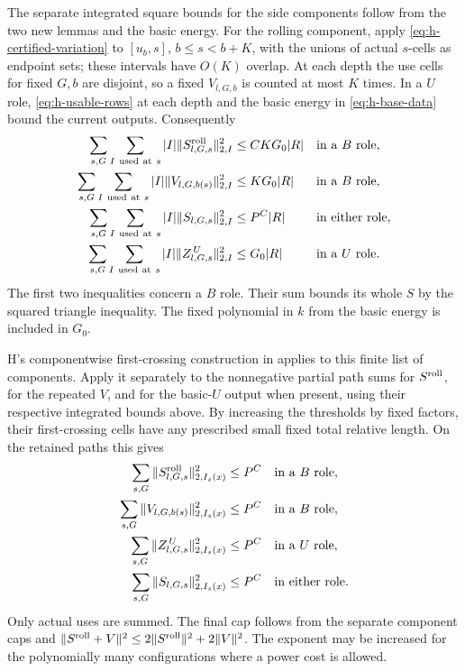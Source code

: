 The separate integrated square bounds for the side components
follow from the two new lemmas and the basic energy.  For the
rolling component, apply \eqref{eq:h-certified-variation} to
\([u_b,s]\), \(b\le s<b+K\), with the unions of actual \(s\)-cells
as endpoint sets; these intervals have \(O(K)\) overlap.  At each
depth the use cells for fixed \(G,b\) are disjoint, so a fixed
\(V_{l,G,b}\) is counted at most \(K\) times.  In a \(U\) role,
\eqref{eq:h-usable-rows} at each depth and the basic energy in
\eqref{eq:h-base-data} bound the current outputs.  Consequently
\begin{equation}
 \begin{aligned}
 \sum_{s,G}\sum_{I\ {\rm used\ at}\ s}|I|
       \|S^{\rm roll}_{l,G,s}\|_{2,I}^2
       &\le CK G_0|R| &&\text{in a \(B\) role},\\
 \sum_{s,G}\sum_{I\ {\rm used\ at}\ s}|I|
       \|V_{l,G,b(s)}\|_{2,I}^2
       &\le K G_0|R| &&\text{in a \(B\) role},\\
 \sum_{s,G}\sum_{I\ {\rm used\ at}\ s}|I|
       \|S_{l,G,s}\|_{2,I}^2
       &\le P^C|R| &&\text{in either role},\\
 \sum_{s,G}\sum_{I\ {\rm used\ at}\ s}|I|
       \|Z^{\,U}_{l,G,s}\|_{2,I}^2
       &\le G_0|R| &&\text{in a \(U\) role}.
 \end{aligned}
 \label{eq:h-side-square}
\end{equation}
The first two inequalities concern a \(B\) role.  Their sum
bounds its whole \(S\) by the squared triangle inequality.
The fixed polynomial in \(k\) from the basic energy is included
in \(G_0\).

H's componentwise first-crossing construction in
\cite[Section~7, Side estimate]{H} applies to this finite list of
components.  Apply it separately to the nonnegative partial path
sums for \(S^{\rm roll}\), for the repeated \(V\), and for the
basic-\(U\) output when present, using their respective integrated
bounds above.  By increasing the thresholds by fixed factors,
their first-crossing cells have any prescribed small fixed total
relative length.  On the retained paths this gives
\begin{equation}
 \begin{aligned}
 \sum_{s,G}\|S^{\rm roll}_{l,G,s}\|_{2,I_s(x)}^2
       &\le P^C &&\text{in a \(B\) role},\\
 \sum_{s,G}\|V_{l,G,b(s)}\|_{2,I_s(x)}^2
       &\le P^C &&\text{in a \(B\) role},\\
 \sum_{s,G}\|Z^{\,U}_{l,G,s}\|_{2,I_s(x)}^2
       &\le P^C &&\text{in a \(U\) role},\\
 \sum_{s,G}\|S_{l,G,s}\|_{2,I_s(x)}^2
       &\le P^C &&\text{in either role}.
 \end{aligned}
 \label{eq:h-side-cap}
\end{equation}
Only actual uses are summed.  The final cap follows from the
separate component caps and
\(\|S^{\rm roll}+V\|^2\le2\|S^{\rm roll}\|^2+2\|V\|^2\).
The exponent may be increased for the polynomially many
configurations where a power cost is allowed.

